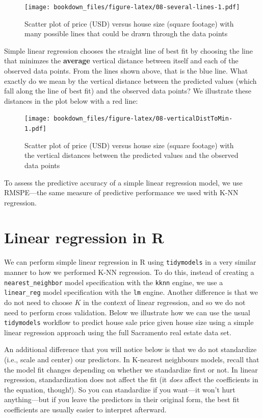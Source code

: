 \documentclass[
]{krantz}
\renewenvironment{quote}{\begin{VF}}{\end{VF}}
\begin{document}
\begin{figure}
\centering
\texttt{[image: bookdown\_files/figure-latex/08-several-lines-1.pdf]}
\caption{\label{fig:08-several-lines}Scatter plot of price (USD) versus house size (square footage) with many possible lines that could be drawn through the data points}
\end{figure}

Simple linear regression chooses the straight line of best fit by choosing
the line that minimzes the \textbf{average} vertical distance between itself and
each of the observed data points. From the lines shown above, that is the blue
line. What exactly do we mean by the vertical distance between the predicted
values (which fall along the line of best fit) and the observed data points?
We illustrate these distances in the plot below with a red line:

\begin{figure}
\centering
\texttt{[image: bookdown\_files/figure-latex/08-verticalDistToMin-1.pdf]}
\caption{\label{fig:08-verticalDistToMin}Scatter plot of price (USD) versus house size (square footage) with the vertical distances between the predicted values and the observed data points}
\end{figure}

To assess the predictive accuracy of a simple linear regression model,
we use RMSPE---the same measure of predictive performance we used with K-NN regression.

\hypertarget{linear-regression-in-r}{%
\section{Linear regression in R}\label{linear-regression-in-r}}

We can perform simple linear regression in R using \texttt{tidymodels} in a
very similar manner to how we performed K-NN regression.
To do this, instead of creating a \texttt{nearest\_neighbor} model specification with
the \texttt{kknn} engine, we use a \texttt{linear\_reg} model specification
with the \texttt{lm} engine. Another difference is that we do not need to choose \(K\) in the
context of linear regression, and so we do not need to perform cross validation.
Below we illustrate how we can use the usual \texttt{tidymodels} workflow to predict house sale
price given house size using a simple linear regression approach using the full
Sacramento real estate data set.

\begin{quote}
An additional difference that you will notice below is that we do not standardize
(i.e., scale and center) our predictors. In K-nearest neighbours models, recall that
the model fit changes depending on whether we standardize first or not. In linear regression,
standardization does not affect the fit (it \emph{does} affect the coefficients in the equation, though!).
So you can standardize if you want---it won't hurt anything---but if you leave the
predictors in their original form, the best fit coefficients are usually easier to interpret afterward.
\end{quote}
\end{document}
